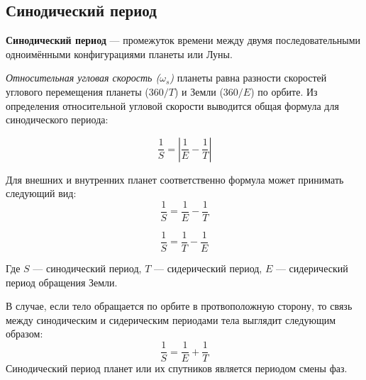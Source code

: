 \subsection{Синодический период}

\textbf{Синодический период} --- промежуток времени между двумя последовательными одноимёнными конфигурациями планеты или Луны.

\textit{Относительная угловая скорость ($\omega_s$)} планеты равна разности скоростей углового перемещения планеты ($360/T$) и Земли ($360/E$) по орбите. Из определения относительной угловой скорости выводится общая формула для синодического периода:

\begin{equation}
\frac1S=\left|\frac1E-\frac1T\right|
\end{equation}

Для внешних и внутренних планет соответственно формула может принимать следующий вид:
\begin{equation}\frac1S=\frac1E-\frac1T
\end{equation}

\begin{equation}\frac1S=\frac1T-\frac1E
\end{equation}

Где $S$ --- синодический период, $T$ --- сидерический период, $E$ --- сидерический период обращения Земли.

В случае, если тело обращается по орбите в протвоположную сторону, то связь между синодическим и сидерическим периодами тела выглядит следующим образом:
\begin{equation}\frac1S=\frac1E+\frac1T
\end{equation}
Синодический период планет или их спутников является периодом смены фаз. 